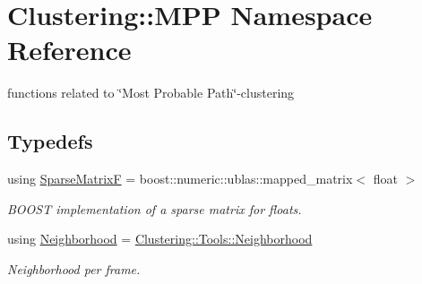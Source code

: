 \hypertarget{namespaceClustering_1_1MPP}{\section{Clustering\-:\-:M\-P\-P Namespace Reference}
\label{namespaceClustering_1_1MPP}
}


functions related to \char`\"{}\-Most Probable Path\char`\"{}-\/clustering  


\subsection*{Typedefs}
\begin{DoxyCompactItemize}
\item 
\hypertarget{namespaceClustering_1_1MPP_aab655de2feb4b56dd87bcc0fc6f13974}{using \hyperlink{namespaceClustering_1_1MPP_aab655de2feb4b56dd87bcc0fc6f13974}{Sparse\-Matrix\-F} = boost\-::numeric\-::ublas\-::mapped\-\_\-matrix$<$ float $>$}\label{namespaceClustering_1_1MPP_aab655de2feb4b56dd87bcc0fc6f13974}

\begin{DoxyCompactList}\small\item\em B\-O\-O\-S\-T implementation of a sparse matrix for floats. \end{DoxyCompactList}\item 
\hypertarget{namespaceClustering_1_1MPP_a39c585c21d2f99427a870eb96ccc0510}{using \hyperlink{namespaceClustering_1_1MPP_a39c585c21d2f99427a870eb96ccc0510}{Neighborhood} = \hyperlink{namespaceClustering_1_1Tools_ad2b6f4886446247db27ece196d76575c}{Clustering\-::\-Tools\-::\-Neighborhood}}\label{namespaceClustering_1_1MPP_a39c585c21d2f99427a870eb96ccc0510}

\begin{DoxyCompactList}\small\item\em Neighborhood per frame. \end{DoxyCompactList}\end{DoxyCompactItemize}
